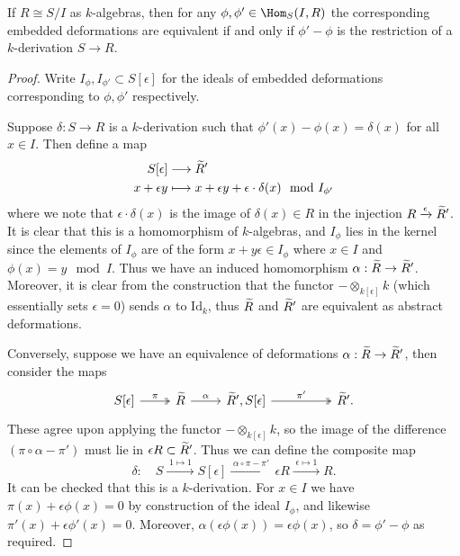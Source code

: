 \begin{theorem} \label{isom classes} 
    If \(R\cong S/I\) as \(k\)-algebras, then for any
    $\phi,\phi'\in\Hom_{S}({I},{R})$ the corresponding embedded deformations are
    equivalent if and only if $\phi'-\phi$ is the restriction of a
    $k$-derivation \(S\rightarrow R\).  

    \begin{proof} 
        Write \(I_\phi, I_{\phi'}\subset S[\epsilon]\) for the ideals of
        embedded deformations corresponding to \(\phi, \phi'\) respectively. 

        Suppose $\delta:S\rightarrow R$ is a $k$-derivation such that
        \(\phi'(x)-\phi(x)=\delta(x)\) for all \(x\in I\). Then define a map
        \begin{align*} 
            S[\epsilon] &\longrightarrow \widetilde{R}' \\ x+\epsilon y &\longmapsto x
            + \epsilon y + \epsilon \cdot \delta(x) \mod I_{\phi'}
        \end{align*}
        where we note that \(\epsilon\cdot \delta(x)\) is the image of
        \(\delta(x)\in R\) in the injection \(R\xrightarrow{\epsilon} \widetilde{R}'\).
        It is clear that this is a homomorphism of \(k\)-algebras, and
        \(I_\phi\) lies in the kernel since the elements of \(I_\phi\) are of
        the form \(x+y\epsilon \in I_\phi\) where \(x\in I\) and \(\phi(x)=y
        \mod I\). Thus we have an induced homomorphism  \(\alpha: \widetilde{R}\rightarrow
        \widetilde{R}'\). Moreover, it is clear from the construction that the functor
        \(-\otimes_{k[\epsilon]}k\) (which essentially sets \(\epsilon = 0\))
        sends \(\alpha\) to \(\text{Id}_k\), thus \(\widetilde{R}\) and \(\widetilde{R}'\) are
        equivalent as abstract deformations.

        Conversely, suppose we have an equivalence of deformations
        $\alpha:\widetilde{R}\to \widetilde{R}'$, then consider the maps
        \[\begin{tikzcd}[row sep = tiny] 
            S[\epsilon]\arrow[r,"\pi", two heads] & \wt{R} \arrow[r,"\alpha"] &
            \wt{R}', S[\epsilon]\arrow[rr,"\pi'", two heads] & & \wt{R}'.
        \end{tikzcd}\] 
        These agree upon applying the functor \(-\otimes_{k[\epsilon]} k\), so
        the image of the difference \((\pi\circ \alpha-\pi')\) must lie in
        \(\epsilon R \subset \widetilde{R}'\). Thus we can define the composite map
        \[\delta :\quad S \xrightarrow{\;1\mapsto 1\;} S[\epsilon]
            \xrightarrow{\;\alpha \circ \pi - \pi'\;} \epsilon R
            \xrightarrow{\;\epsilon \mapsto 1\;} R.\]
        It can be checked that this is a \(k\)-derivation. For \(x\in
        I\) we have \(\pi(x) +\epsilon \phi(x) =0\) by construction of
        the ideal \(I_\phi\), and likewise \(\pi'(x) + \epsilon \phi'(x) = 0\).
        Moreover, \(\alpha(\epsilon \phi(x)) = \epsilon \phi(x)\), so \(\delta =
        \phi'-\phi\) as required.
    \end{proof}
\end{theorem}

